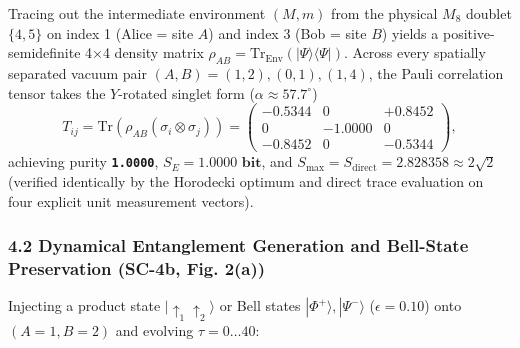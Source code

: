 \documentclass[
  a4paper,
]{article}
\begin{document}
Tracing out the intermediate environment \((M, m)\) from the physical
\(M_8\) doublet \(\{4,5\}\) on index 1 (Alice = site \(A\)) and index 3
(Bob = site \(B\)) yields a positive-semidefinite 4×4 density matrix
\(\rho_{AB} = \mathrm{Tr}_{\mathrm{Env}}(|\Psi\rangle\langle\Psi|)\).
Across every spatially separated vacuum pair
\((A,B) = (1,2), (0,1), (1,4)\), the Pauli correlation tensor takes the
\(Y\)-rotated singlet form (\(\alpha \approx 57.7^\circ\))
\[T_{ij} = \mathrm{Tr}(\rho_{AB}(\sigma_i\otimes\sigma_j)) = \begin{pmatrix} -0.5344 & 0 & +0.8452 \\ 0 & -1.0000 & 0 \\ -0.8452 & 0 & -0.5344 \end{pmatrix},\]
achieving purity \textbf{\texttt{1.0000}},
\(S_E = \mathbf{1.0000\text{ bit}}\), and
\textbf{\(S_{\max} = S_{\mathrm{direct}} = \mathbf{2.828358} \approx 2\sqrt{2}\)}
(verified identically by the Horodecki optimum and direct trace
evaluation on four explicit unit measurement vectors).

\subsubsection{4.2 Dynamical Entanglement Generation and Bell-State
Preservation (SC-4b, Fig.
2(a))}\label{dynamical-entanglement-generation-and-bell-state-preservation-sc-4b-fig.-2a}

Injecting a product state \(|\uparrow_1\uparrow_2\rangle\) or Bell
states \(|\Phi^+\rangle, |\Psi^-\rangle\) (\(\epsilon = 0.10\)) onto
\((A=1, B=2)\) and evolving \(\tau = 0 \dots 40\):
\end{document}
